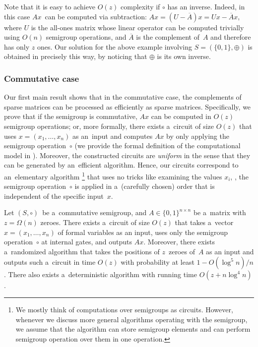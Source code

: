 \documentclass{toc}
\begin{document}
\noindent
Note that it is easy to achieve $O(z)$ complexity if $\circ$ has an inverse.
Indeed, in this case $Ax$~can be computed via subtraction:
$Ax = (U-\overline{A})x = Ux - \overline{A}x$, where $U$ is the all-ones matrix
whose linear operator can be computed trivially using $O(n)$ semigroup
operations, and $\overline{A}$ is the complement of~$A$ and therefore has only
$z$ ones. Our solution for the above example involving $S=(\{0,1\}, \oplus)$
is obtained in precisely this way, by noticing that $\oplus$ is its own inverse.

\subsubsection{Commutative case}
Our first main result shows that in the commutative case,
the %
complements
of sparse matrices can be processed as
efficiently as sparse matrices. Specifically, we prove
that if the semigroup is commutative, $Ax$ can be computed in $O(z)$ semigroup
operations; or, more formally, there exists
a~circuit of size $O(z)$ that uses $x=(x_1, \dotsc, x_n)$ as
an~input and computes $Ax$ by only applying the semigroup
operation~$\circ$ (we provide the formal definition of the
computational model in ). Moreover,
the constructed circuits are \emph{uniform} in the sense that they
can be generated by an~efficient algorithm. Hence, our circuits
correspond to an~elementary algorithm%
\footnote{We mostly think of computations over semigroups as circuits. However, whenever we discuss more general algorithms operating with the semigroup, we assume that the algorithm can store semigroup elements and can perform semigroup operation over them in one operation.}
%
 that uses no tricks like examining the
values $x_i$, \ie, the semigroup operation~$\circ$ is applied in a~(carefully
chosen) order that is independent of the specific input~$x$.

\begin{theorem}
\label{thm:upperboundold}
Let $(S, \circ)$~be a~commutative semigroup,
and $A \in \{0,1\}^{n \times n}$ be a~matrix
with~$z=\Omega(n)$ zeroes.
There exists a~circuit of size $O(z)$ that takes
a~vector $x = (x_1,\ldots, x_n)$ of formal variables as an input,
uses only the semigroup operation~$\circ$ at internal gates,
and outputs $Ax$. Moreover, there exists a~randomized
algorithm that takes the positions of $z$~zeroes of~$A$
as an input and outputs such a~circuit in time $O(z)$
with probability at least $1-O(\log^5n)/n$. There also
exists a~deterministic algorithm with running time $O(z+n\log^4n)$.
\end{theorem}
\end{document}
